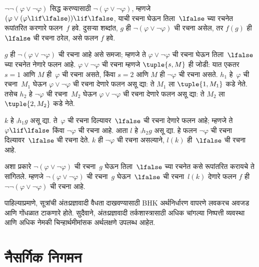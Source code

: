 \begin{ex}
$\lnot \lnot (\varphi \lor \lnot \varphi)$ सिद्ध करण्यासाठी
$\lnot(\varphi \lor \lnot \varphi)$, म्हणजे $(\varphi
\lor (\varphi \lif \lfalse)) \lif \lfalse$, याची रचना
घेऊन तिला~$\lfalse$ च्या रचनेत रूपांतरित करणारे
फलन~$f$ हवे. दुसऱ्या शब्दांत, $g$ ही $\lnot(\varphi
\lor \lnot \varphi)$ ची रचना असेल, तर $f(g)$ ही
$\lfalse$ ची रचना ठरेल, असे फलन $f$ हवे.

$g$ ही $\lnot(\varphi \lor \lnot \varphi)$ ची रचना आहे असे
समजा; म्हणजे ते $\varphi \lor \lnot \varphi$ ची रचना घेऊन
तिला~$\lfalse$ च्या रचनेत नेणारे फलन आहे.
$\varphi \lor \lnot \varphi$ ची रचना म्हणजे $\tuple{s, M}$
ही जोडी: यात एकतर $s = 1$ आणि $M$ ही~$\varphi$ ची
रचना असते, किंवा $s = 2$ आणि $M$ ही $\lnot \varphi$
ची रचना असते. $h_1$ हे~$\varphi$ ची रचना~$M_1$ घेऊन
$\varphi \lor \lnot \varphi$ ची रचना देणारे फलन असू द्या:
ते $M_1$ ला $\tuple{1, M_1}$ कडे नेते. तसेच $h_2$
हे $\lnot \varphi$ ची रचना~$M_2$ घेऊन
$\varphi \lor \lnot \varphi$ ची रचना देणारे फलन असू द्या:
ते $M_2$ ला $\tuple{2, M_2}$ कडे नेते.

$k$ हे $\comp{h_1}{g}$ असू द्या. ते~$\varphi$ ची रचना
दिल्यावर~$\lfalse$ ची रचना देणारे फलन आहे; म्हणजे
ते~$\varphi \lif \lfalse$ किंवा $\lnot \varphi$ ची रचना
आहे. आता $l$ हे $\comp{h_2}{g}$ असू द्या. हे
फलन $\lnot \varphi$ ची रचना दिल्यावर~$\lfalse$ ची
रचना देते. $k$ ही $\lnot \varphi$ ची रचना असल्याने,
$l(k)$ ही~$\lfalse$ ची रचना आहे.

अशा प्रकारे $\lnot(\varphi \lor \lnot \varphi)$ ची
रचना~$g$ घेऊन तिला~$\lfalse$ च्या रचनेत कसे
रूपांतरित करायचे ते सांगितले. म्हणजे
$\lnot(\varphi \lor \lnot \varphi)$ ची रचना~$g$
घेऊन~$\lfalse$ ची रचना~$l(k)$ देणारे फलन $f$
ही $\lnot\lnot(\varphi \lor \lnot \varphi)$ ची रचना आहे.
\end{ex}

पाहिल्याप्रमाणे, सूत्रांची अंतःप्रज्ञावादी
वैधता दाखवण्यासाठी BHK अर्थनिर्धारण वापरणे लवकरच
अवजड आणि गोंधळात टाकणारे होते. सुदैवाने,
अंतःप्रज्ञावादी तर्कशास्त्रासाठी अधिक चांगल्या
निष्पत्ती व्यवस्था आणि अधिक नेमकी
चिन्हार्थमीमांसक अर्थलक्षणे उपलब्ध आहेत.











\section{नैसर्गिक निगमन}\label{int:int:ntd:sec}


